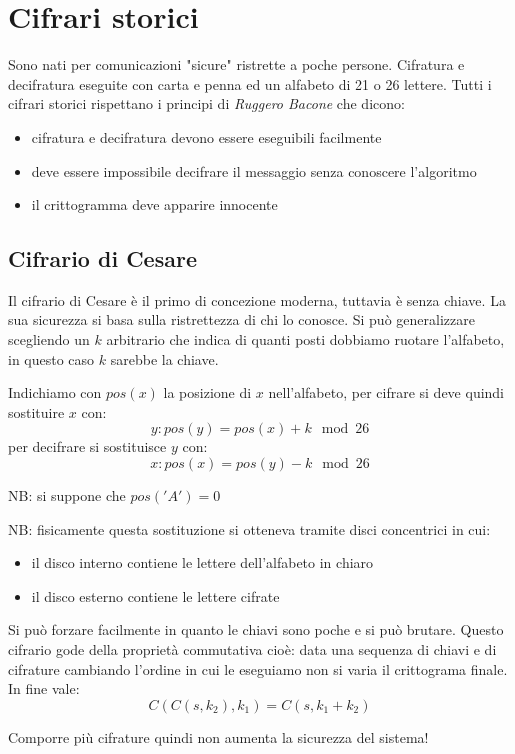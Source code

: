 \section{Cifrari storici}
Sono nati per comunicazioni "sicure" ristrette a poche persone. Cifratura e decifratura eseguite con carta e penna ed un alfabeto di 21 o 26 lettere. Tutti i cifrari storici rispettano i principi di \emph{Ruggero Bacone} che dicono:
\begin{itemize}
    \item cifratura e decifratura devono essere eseguibili facilmente
    \item deve essere impossibile decifrare il messaggio senza conoscere l'algoritmo
    \item il crittogramma deve apparire innocente
\end{itemize}

\subsection{Cifrario di Cesare}
Il cifrario di Cesare è il primo di concezione moderna, tuttavia è senza chiave. La sua sicurezza si basa sulla ristrettezza di chi lo conosce. Si può generalizzare scegliendo un $k$ arbitrario che indica di quanti posti dobbiamo ruotare l'alfabeto, in questo caso $k$ sarebbe la chiave. 

Indichiamo con $pos(x)$ la posizione di $x$ nell'alfabeto, per cifrare si deve quindi sostituire $x$ con:
$$ y : pos(y) = pos(x) + k \mod 26 $$
per decifrare si sostituisce $y$ con:
$$ x : pos(x) = pos(y) - k \mod 26 $$

NB: si suppone che $pos('A') = 0$

NB: fisicamente questa sostituzione si otteneva tramite disci concentrici in cui:
\begin{itemize}
    \item il disco interno contiene le lettere dell'alfabeto in chiaro
    \item il disco esterno contiene le lettere cifrate
\end{itemize}

Si può forzare facilmente in quanto le chiavi sono poche e si può brutare. Questo cifrario gode della proprietà commutativa cioè: data una sequenza di chiavi e di cifrature cambiando l'ordine in cui le eseguiamo non si varia il crittograma finale. In fine vale:
$$ C(C(s, k_2), k_1) = C(s, k_1 + k_2) $$

Comporre più cifrature quindi non aumenta la sicurezza del sistema!

